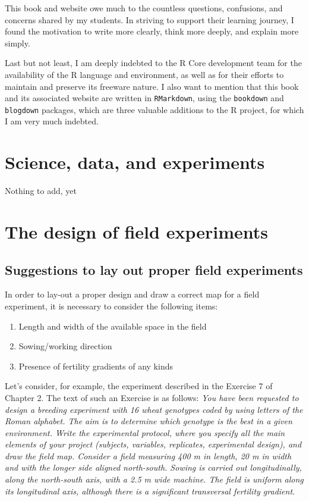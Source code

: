 \documentclass[
  letterpaper,
  DIV=11,
  numbers=noendperiod]{scrreprt}
\providecommand{\tightlist}{%
  \setlength{\itemsep}{0pt}\setlength{\parskip}{0pt}}
\begin{document}
This book and website owe much to the countless questions, confusions,
and concerns shared by my students. In striving to support their
learning journey, I found the motivation to write more clearly, think
more deeply, and explain more simply.

Last but not least, I am deeply indebted to the R Core development team
for the availability of the R language and environment, as well as for
their efforts to maintain and preserve its freeware nature. I also want
to mention that this book and its associated website are written in
\texttt{RMarkdown}, using the \texttt{bookdown} and \texttt{blogdown}
packages, which are three valuable additions to the R project, for which
I am very much indebted.


\chapter{Science, data, and
experiments}\label{science-data-and-experiments}

Nothing to add, yet


\chapter{The design of field
experiments}\label{the-design-of-field-experiments}

\section{Suggestions to lay out proper field
experiments}\label{suggestions-to-lay-out-proper-field-experiments}

In order to lay-out a proper design and draw a correct map for a field
experiment, it is necessary to consider the following items:

\begin{enumerate}
\def\labelenumi{\arabic{enumi}.}
\tightlist
\item
  Length and width of the available space in the field
\item
  Sowing/working direction
\item
  Presence of fertility gradients of any kinds
\end{enumerate}

Let's consider, for example, the experiment described in the Exercise 7
of Chapter 2. The text of such an Exercise is as follows: \emph{You have
been requested to design a breeding experiment with 16 wheat genotypes
coded by using letters of the Roman alphabet. The aim is to determine
which genotype is the best in a given environment. Write the
experimental protocol, where you specify all the main elements of your
project (subjects, variables, replicates, experimental design), and draw
the field map. Consider a field measuring 400 m in length, 20 m in width
and with the longer side aligned north-south. Sowing is carried out
longitudinally, along the north-south axis, with a 2.5 m wide machine.
The field is uniform along its longitudinal axis, although there is a
significant transversal fertility gradient}.
\end{document}
